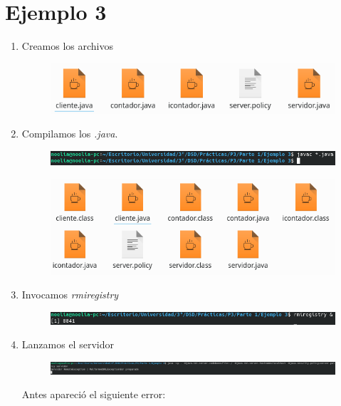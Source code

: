 \documentclass{article}
\begin{document}
	\section{Ejemplo 3}
	\begin{enumerate}
		\item Creamos los archivos
		\begin{figure}[H]
			\centering
			\includegraphics[totalheight=2cm]{img/19.png}
		\end{figure}
		\item Compilamos los {\it .java}.
		\begin{figure}[H]
			\centering
			\includegraphics[totalheight=0.5cm]{img/20.png}
		\end{figure}
		\begin{figure}[H]
			\centering
			\includegraphics[totalheight=4cm]{img/21.png}
		\end{figure}
		\item Invocamos {\it rmiregistry}
		\begin{figure}[H]
			\centering
			\includegraphics[totalheight=0.55cm]{img/22.png}
		\end{figure}
		\item Lanzamos el servidor
		\begin{figure}[H]
			\centering
			\includegraphics[totalheight=0.6cm]{img/23.png}
		\end{figure}
		Antes apareció el siguiente error:

\end{enumerate}
\end{document}
